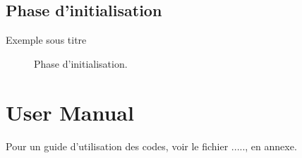\documentclass[12pt,a4paper]{article}
\begin{document}
\subsection{Phase d'initialisation}
Exemple sous titre

\begin{figure}[H]
%
\caption{Phase d'initialisation.}
\label{fig:initalisation}
\end{figure}

\section{User Manual}
Pour un guide d'utilisation des codes, voir le fichier ....., en annexe.





\end{document}
